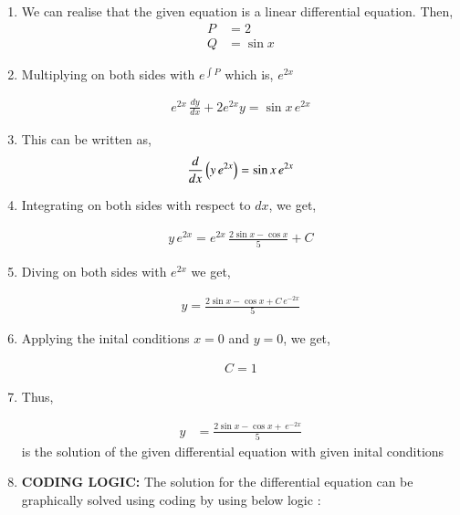 \documentclass[journal]{IEEEtran}
\begin{document}
\begin{enumerate}
    \item We can realise that the given equation is a linear differential equation. Then,
    \begin{align}
	    P &= 2\\
        Q &= \sin{x}
    \end{align}

    \item Multiplying on both sides with $e^{\int P}$ which is, $e^{2x}$

    \begin{align}
	    e^{2x}\, \frac{dy}{dx} + 2e^{2x} y = \sin{x}\, e^{2x}
    \end{align}
    
    \item This can be written as,
    \begin{align}
	    \frac{d}{dx}\left(y\, e^{2x}\right) = \sin{x}\, e^{2x}
    \end{align}

    \item Integrating on both sides with respect to $dx$, we get,

    \begin{align}
	    y\, e^{2x} = e^{2x}\, \frac{2\sin{x} - \cos{x}}{5} + C
    \end{align}

    \item Diving on both sides with $e^{2x}$ we get,

    \begin{align}
	    y = \frac{2 \sin{x} - \cos{x} + C\, e^{-2x}}{5}
    \end{align}

    
    \item Applying the inital conditions $x = 0$ and $y = 0$, we get,

    \begin{align}
        C = 1
    \end{align}

    \item Thus,

    \begin{align}
        y &= \frac{2 \sin{x} - \cos{x} + \, e^{-2x}}{5}
    \end{align}
    is the solution of the given differential equation with given inital conditions
    
    
    \item \textbf{CODING LOGIC:} The solution for the differential equation can be graphically solved using coding by using below logic :


\end{enumerate}
\end{document}
